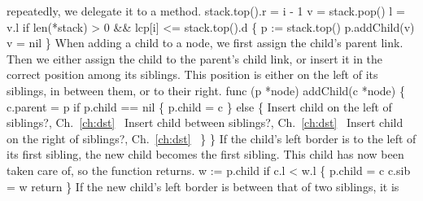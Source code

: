 repeatedly, we delegate it to a method.
\nwenddocs{}\endmoddef\nwstartdeflinemarkup{}\nwenddeflinemarkup
stack.top().r = i - 1
v = stack.pop()
l = v.l
if len(*stack) > 0 && lcp[i] <= stack.top().d \{
          p := stack.top()
          p.addChild(v)
          v = nil
\}
\nwendcode{}\nwdocspar
When adding a child to a node, we first assign the child's parent
link. Then we either assign the child to the parent's child link, or
insert it in the correct position among its siblings. This position is
either on the left of its siblings, in between them, or to their
right.
\nwenddocs{}\plusendmoddef\nwstartdeflinemarkup{}\nwenddeflinemarkup
func (p *node) addChild(c *node) \{
          c.parent = p
          if p.child == nil \{
                  p.child = c
          \} else \{
                  \LA{}Insert child on the left of siblings?, Ch.~\ref{ch:dst}~{\nwtagstyle{}}\RA{}
                  \LA{}Insert child between siblings?, Ch.~\ref{ch:dst}~{\nwtagstyle{}}\RA{}
                  \LA{}Insert child on the right of siblings?, Ch.~\ref{ch:dst}~{\nwtagstyle{}}\RA{}
          \}
\}
\nwendcode{}\nwdocspar
If the child's left border is to the left of its first sibling, the
new child becomes the first sibling. This child has now been taken
care of, so the function returns.
\nwenddocs{}\endmoddef\nwstartdeflinemarkup{}\nwenddeflinemarkup
w := p.child
if c.l < w.l \{
          p.child = c
          c.sib = w
          return
\}
\nwendcode{}\nwdocspar
If the new child's left border is between that of two siblings, it is
